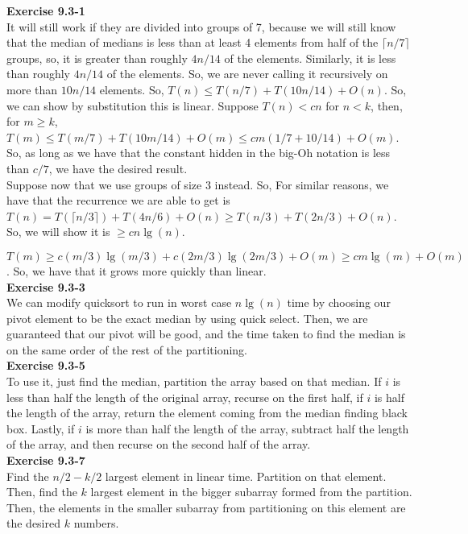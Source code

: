 \documentclass{article}
\begin{document}
\noindent\textbf{ Exercise 9.3-1} \\
It will still work if they are divided into groups of 7, because we will still know that the median of medians is less than at least 4 elements from half of the $\lceil n/7 \rceil$ groups, so, it is greater than roughly $4n/14$ of the elements. Similarly, it is less than roughly $4n/14$ of the elements. So, we are never calling it recursively on more than $10n/14$ elements. So, $T(n) \le T(n/7) + T(10n/14)+O(n)$. So, we can show by substitution this is linear. Suppose $T(n) < cn$ for $n<k$, then, for $m\ge k$, $T(m) \le T(m/7) + T(10m/14) + O(m) \le cm(1/7+10/14) + O(m)$. So, as long as we have that the constant hidden in the big-Oh notation is less than $c/7$, we have the desired result.\\

Suppose now that we use groups of size $3$ instead. So, For similar reasons, we have that the recurrence we are able to get is $T(n) = T(\lceil n/3 \rceil) + T(4n/6) + O(n) \ge T(n/3)+ T(2n/3) +O(n)$. So, we will show it is $\ge cn\lg(n)$.

$T(m) \ge c (m/3)\lg(m/3) + c(2m/3) \lg(2m/3) +O(m) \ge  c m \lg(m) +O(m)$. So, we have that it grows more quickly than linear.\\


\noindent\textbf{ Exercise 9.3-3} \\
We can modify quicksort to run in worst case $n\lg(n)$ time by choosing our pivot element to be the exact median by using quick select. Then, we are guaranteed that our pivot will be good, and the time taken to find the median is on the same order of the rest of the partitioning.\\


\noindent\textbf{ Exercise 9.3-5} \\
To use it, just find the median, partition the array based on that median. If $i$ is less than half the length of the original array, recurse on the first half, if $i$ is half the length of the array, return the element coming from the median finding black box. Lastly, if $i$ is more than half the length of the array, subtract half the length of the array, and then recurse on the second half of the array.\\



\noindent\textbf{ Exercise 9.3-7} \\
Find the $n/2-k/2$ largest element in linear time. Partition on that element. Then, find the $k$ largest element in the bigger subarray formed from the partition. Then, the elements in the smaller subarray from partitioning on this element are the desired $k$ numbers.\\
\end{document}
